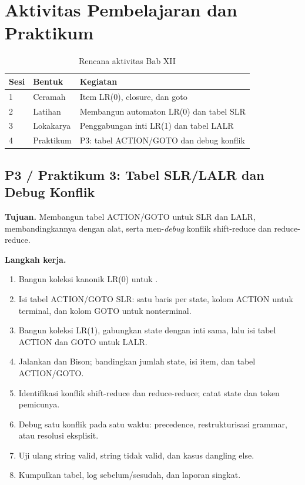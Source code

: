 \section*{Aktivitas Pembelajaran dan Praktikum}

\begin{table}[H]
\centering
\caption{Rencana aktivitas Bab XII}
\label{tab:ch12-aktivitas}
\begin{tabularx}{\textwidth}{@{}llX@{}}
\toprule
\textbf{Sesi} & \textbf{Bentuk} & \textbf{Kegiatan} \\
\midrule
1 & Ceramah & Item LR(0), closure, dan goto \\
2 & Latihan & Membangun automaton LR(0) dan tabel SLR \\
3 & Lokakarya & Penggabungan inti LR(1) dan tabel LALR \\
4 & Praktikum & P3: tabel ACTION/GOTO dan debug konflik \\
\bottomrule
\end{tabularx}
\end{table}

\subsection*{P3 / Praktikum 3: Tabel SLR/LALR dan Debug Konflik}
\textbf{Tujuan.} Membangun tabel ACTION/GOTO untuk SLR dan LALR,
membandingkannya dengan alat, serta men-\textit{debug} konflik
shift-reduce dan reduce-reduce.

\textbf{Langkah kerja.}
\begin{enumerate}[label=\arabic*.,leftmargin=*]
  \item Bangun koleksi kanonik LR(0) untuk
        .
  \item Isi tabel ACTION/GOTO SLR: satu baris per state, kolom ACTION
        untuk terminal, dan kolom GOTO untuk nonterminal.
  \item Bangun koleksi LR(1), gabungkan state dengan inti sama, lalu
        isi tabel ACTION dan GOTO untuk LALR.
  \item Jalankan  dan Bison; bandingkan jumlah
        state, isi item, dan tabel ACTION/GOTO.
  \item Identifikasi konflik shift-reduce dan reduce-reduce; catat
        state dan token pemicunya.
  \item Debug satu konflik pada satu waktu: precedence,
        restrukturisasi grammar, atau resolusi eksplisit.
  \item Uji ulang string valid, string tidak valid, dan kasus
        dangling else.
  \item Kumpulkan tabel, log sebelum/sesudah, dan laporan singkat.
\end{enumerate}

